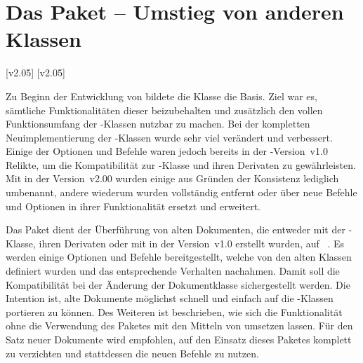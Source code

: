\section{Das Paket  -- Umstieg von anderen Klassen}
\begin{Bundle*}{}
%
%

[v2.05]
[v2.05]

\noindent{}

\bigskip\noindent
Zu Beginn der Entwicklung von \TUDScript bildete die Klasse 
die Basis. Ziel war es, sämtliche Funktionalitäten dieser beizubehalten und 
zusätzlich den vollen Funktionsumfang der \KOMAScript-Klassen nutzbar zu 
machen. Bei der kompletten Neuimplementierung der \TUDScript-Klassen wurde sehr 
viel verändert und verbessert. Einige der Optionen und Befehle waren jedoch 
bereits in der \TUDScript-Version~v1.0 Relikte, um die Kompatibilität zur 
-Klasse und ihren Derivaten zu gewährleisten. Mit \TUDScript in 
der Version~v2.00 wurden einige aus Gründen der Konsistenz lediglich umbenannt, 
andere wiederum wurden vollständig entfernt oder über neue Befehle und Optionen 
in ihrer Funktionalität ersetzt und erweitert. 

Das Paket  dient der Überführung von alten Dokumenten, die 
entweder mit der -Klasse, ihren Derivaten oder mit \TUDScript in 
der Version~v1.0 erstellt wurden, auf \TUDScript~\vTUDScript. Es werden einige 
Optionen und Befehle bereitgestellt, welche von den alten Klassen definiert 
wurden und das entsprechende Verhalten nachahmen. Damit soll die Kompatibilität 
bei der Änderung der Dokumentklasse sichergestellt werden. Die Intention ist, 
alte Dokumente möglichst schnell und einfach auf die \TUDScript-Klassen 
portieren zu können. Des Weiteren ist beschrieben, wie sich die Funktionalität 
ohne die Verwendung des Paketes  mit den Mitteln von 
\TUDScript umsetzen lassen. Für den Satz neuer Dokumente wird empfohlen, auf 
den Einsatz dieses Paketes komplett zu verzichten und stattdessen die neuen 
Befehle zu nutzen.


\end{Bundle*}
